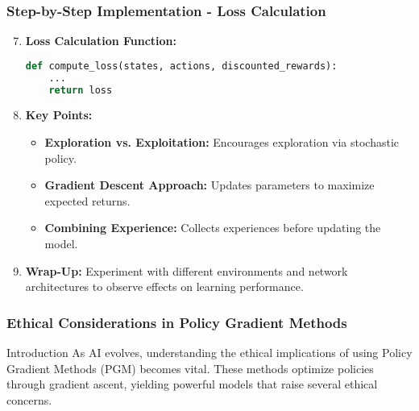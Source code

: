 \documentclass[aspectratio=169]{beamer}
\begin{document}
\begin{frame}[fragile]
    \frametitle{Step-by-Step Implementation - Loss Calculation}
    \begin{enumerate}
        \setcounter{enumi}{6}
        \item \textbf{Loss Calculation Function:}
        \begin{lstlisting}[language=python]
def compute_loss(states, actions, discounted_rewards):
    ...
    return loss
        \end{lstlisting}
    
        \item \textbf{Key Points:}
        \begin{itemize}
            \item \textbf{Exploration vs. Exploitation:} Encourages exploration via stochastic policy.
            \item \textbf{Gradient Descent Approach:} Updates parameters to maximize expected returns.
            \item \textbf{Combining Experience:} Collects experiences before updating the model.
        \end{itemize}
        
        \item \textbf{Wrap-Up:} 
        Experiment with different environments and network architectures to observe effects on learning performance.
    \end{enumerate}
\end{frame}

\begin{frame}[fragile]
    \frametitle{Ethical Considerations in Policy Gradient Methods}
    \begin{block}{Introduction}
        As AI evolves, understanding the ethical implications of using Policy Gradient Methods (PGM) becomes vital. These methods optimize policies through gradient ascent, yielding powerful models that raise several ethical concerns.
    \end{block}
\end{frame}
\end{document}
